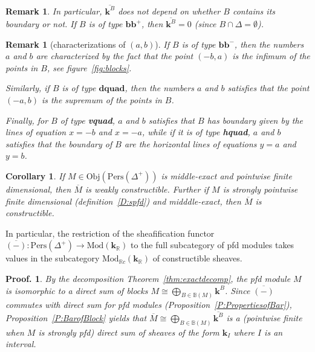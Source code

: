 \documentclass[a4paper, english, 11pt]{article}
\newcommand{\kk}[0]{\textbf{k}}
\newcommand{\Mod}[0]{\text{Mod}}
\newcommand{\Pe}{\text{Pers}}
\newcommand{\0}{\vec{0}}
\newcommand{\R}[0]{\mathbb{R}}
\newcommand{\Obj}[0]{\text{Obj}}
\newtheorem*{pf}{Proof.} }
\newtheorem{cor}[prop]{Corollary}
\newtheorem{remark}[prop]{Remark}
\begin{document}
\begin{remark}
In particular, $\overline{\kk^B}$ does not depend on whether $B$ contains its boundary or not. If $B$ is of type $\textbf{bb}^+$, then $\overline{\kk^B} =0$ (since $B\cap \Delta =\emptyset$). 
\end{remark}
\begin{remark}[characterizations of $(a,b)$]\label{R:caracofab}
 If $B$ is of type $\textbf{bb}^-$, then the numbers $a$ and $b$ are characterized by the fact that the point $(-b,a)$ is the infimum of the points in $B$, see figure~\eqref{fig:blocks}.
 
 Similarly, if $B$ is of type $\textbf{dquad}$, then the numbers $a$ and $b$ satisfies that the point $(-a,b)$ is the supremum of the points in $B$. 
 
 Finally, for $B$ of type \textbf{vquad}, $a$ and $b$ satisfies that $B$ has boundary given by the lines of equation $x=-b$ and $x=-a$, while if it is of type \textbf{hquad}, $a$ and $b$ satisfies that the boundary of $B$ are the horizontal lines of equations $y=a$ and $y=b$.
\end{remark}


\begin{cor}\label{C:pfdimpliesconstructible}
 If $M \in \Obj(\Pe(\Delta^{+}))$ is middle-exact and pointwise finite dimensional, then $\overline{M}$ is weakly constructible. 
 Further if $M$ is strongly pointwise finite dimensional (definition~\ref{D:spfd}) and midddle-exact, then $\overline{M}$ is constructible. 
\end{cor}
In particular, the restriction of the sheafification functor $\overline{(-)}:\Pe(\Delta^{+})\to \Mod(\kk_\R)$ to the full subcategory of pfd modules takes values in the subcategory $ \Mod_{\R c}(\kk_\R)$ of constructible sheaves.
\begin{pf}
 By the decomposition Theorem~\ref{thm:exactdecomp}, the pfd module $M$ is isomorphic to a direct sum of blocks $M\cong  \bigoplus_{B\in \mathbb{B}(M)} \kk^B$. Since $\overline{(-)}$ commutes with direct sum for pfd modules (Proposition~\ref{P:PropertiesofBar}), Proposition~\ref{P:BarofBlock} yields that $\overline{M} \cong \bigoplus_{B\in \mathbb{B}(M)} \overline{\kk^B} $ is a (pointwise finite when $M$ is strongly pfd) direct sum of sheaves of the form $\kk_{I}$ where $I$ is an interval. 
\end{pf}
\end{document}
